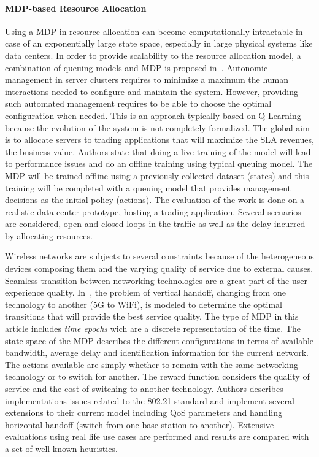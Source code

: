 
\paragraph{MDP-based Resource Allocation}

Using a MDP in resource allocation can become computationally intractable in case of an exponentially large state space, especially in large physical systems like data centers. In order to provide scalability to the resource allocation model, a combination of queuing models and MDP is proposed in~\cite{Tesauro2006}.
Autonomic management in server clusters requires to minimize a maximum the human interactions needed to configure and maintain the system.
However, providing such automated management requires to be able to choose the optimal configuration when needed.
This is an approach typically based on Q-Learning because the evolution of the system is not completely formalized.
The global aim is to allocate servers to trading applications that will maximize the SLA revenues, \ie the business value.
Authors state that doing a live training of the model will lead to performance issues and do an offline training using typical queuing model. The MDP will be trained offline using a previously collected dataset (states) and this training will be completed with a queuing model that provides management decisions as the initial policy (actions).
The evaluation of the work is done on a realistic data-center prototype, hosting a trading application. 
Several scenarios are considered, open and closed-loops in the traffic as well as the delay incurred by allocating resources.

Wireless networks are subjects to several constraints because of the heterogeneous devices composing them and the varying quality of service due to external causes. Seamless transition between networking technologies are a great part of the user experience quality. In~\cite{navarro2008}, the problem of vertical handoff, \ie changing from one technology to another (\eg 5G to WiFi), is modeled to determine the optimal transitions that will provide the best service quality. 
The type of MDP in this article includes \textit{time epochs} wich are a discrete representation of the time.
The state space of the MDP describes the different configurations in terms of available bandwidth, average delay and identification information for the current network.
The actions available are simply whether to remain with the same networking technology or to switch for another. The reward function considers the quality of service and the cost of switching to another technology.
Authors describes implementations issues related to the 802.21 standard and implement several extensions to their current model including QoS parameters and handling horizontal handoff (\ie switch from one base station to another).
Extensive evaluations using real life use cases are performed and results are compared with a set of well known heuristics.

